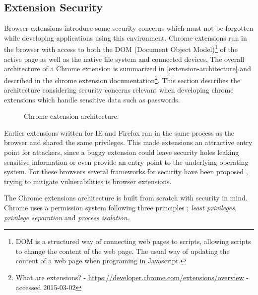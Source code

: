 \subsection{Extension Security}\label{extension-sec}
\par Browser extensions introduce some security concerns which must not be forgotten while developing applications using this environment. Chrome extensions run in the browser with access to both the DOM (Document Object Model)\footnote{DOM is a structured way of connecting web pages to scripts, allowing scripts to change the content of the web page. The usual way of updating the content of a web page when programing in Javascript.} of the active page as well as the native file system and connected devices. The overall architecture of a Chrome extension is summarized in \autoref{extension-architecture} and described in the chrome extension documentation\footnote{What are extensions? - \url{https://developer.chrome.com/extensions/overview} - accessed 2015-03-02}. This section describes the architecture considering security concerns relevant when developing chrome extensions which handle sensitive data such as passwords.



\begin{figure}[ht]
    \caption{Chrome extension architecture.}
    \label{extension-architecture}
\end{figure}

\par Earlier extensions written for IE and Firefox ran in the same process as the browser and shared the same privileges. This made extensions an attractive entry point for attackers, since a buggy extension could leave security holes leaking sensitive information or even provide an entry point to the underlying operating system. For these browsers several frameworks for security have been proposed \cite{firefox-ie, js-info-flow}, trying to mitigate vulnerabilities is browser extensions. 
\par The Chrome extensions architecture is built from scratch with security in mind. Chrome uses a permission system following three principles \cite{liu-chrome}; \emph{least privileges}, \emph{privilege separation} and \emph{process isolation}. 

